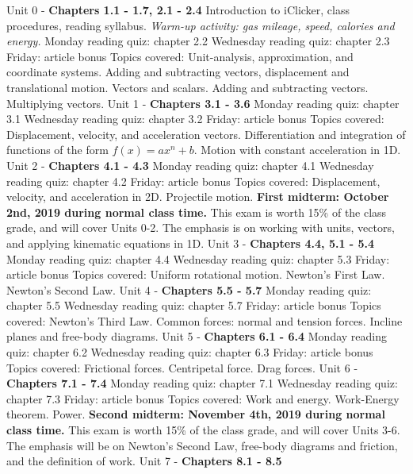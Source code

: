 \documentclass[10pt]{article}
\begin{document}
\begin{outline}[enumerate]
\1 Unit 0 - \textbf{Chapters 1.1 - 1.7, 2.1 - 2.4}
\2 Introduction to iClicker, class procedures, reading syllabus.
\2 \textit{Warm-up activity: gas mileage, speed, calories and energy.}
\2 Monday reading quiz: chapter 2.2
\2 Wednesday reading quiz: chapter 2.3
\2 Friday: article bonus
\2 Topics covered: 
\3 Unit-analysis, approximation, and coordinate systems.
\3 Adding and subtracting vectors, displacement and translational motion.
\3 Vectors and scalars.
\3 Adding and subtracting vectors.
\3 Multiplying vectors.
\1 Unit 1 - \textbf{Chapters 3.1 - 3.6}
\2 Monday reading quiz: chapter 3.1
\2 Wednesday reading quiz: chapter 3.2
\2 Friday: article bonus
\2 Topics covered:
\3 Displacement, velocity, and acceleration vectors.
\3 Differentiation and integration of functions of the form $f(x) = a x^n + b$.
\3 Motion with constant acceleration in 1D.
\1 Unit 2 - \textbf{Chapters 4.1 - 4.3}
\2 Monday reading quiz: chapter 4.1
\2 Wednesday reading quiz: chapter 4.2
\2 Friday: article bonus
\2 Topics covered:
\3 Displacement, velocity, and acceleration in 2D.
\3 Projectile motion.
\1 \textbf{First midterm: October 2nd, 2019 during normal class time.}  This exam is worth 15\% of the class grade, and will cover Units 0-2. The emphasis is on working with units, vectors, and applying kinematic equations in 1D.
\1 Unit 3 - \textbf{Chapters 4.4, 5.1 - 5.4}
\2 Monday reading quiz: chapter 4.4
\2 Wednesday reading quiz: chapter 5.3
\2 Friday: article bonus
\2 Topics covered:
\3 Uniform rotational motion.
\3 Newton's First Law.
\3 Newton's Second Law.
\1 Unit 4 - \textbf{Chapters 5.5 - 5.7}
\2 Monday reading quiz: chapter 5.5
\2 Wednesday reading quiz: chapter 5.7
\2 Friday: article bonus
\2 Topics covered:
\3 Newton's Third Law.
\3 Common forces: normal and tension forces.
\3 Incline planes and free-body diagrams.
\1 Unit 5 - \textbf{Chapters 6.1 - 6.4}
\2 Monday reading quiz: chapter 6.2
\2 Wednesday reading quiz: chapter 6.3
\2 Friday: article bonus
\2 Topics covered:
\3 Frictional forces.
\3 Centripetal force.
\3 Drag forces.
\1 Unit 6 - \textbf{Chapters 7.1 - 7.4}
\2 Monday reading quiz: chapter 7.1
\2 Wednesday reading quiz: chapter 7.3
\2 Friday: article bonus
\2 Topics covered:
\3 Work and energy.
\3 Work-Energy theorem.
\3 Power.
\1 \textbf{Second midterm: November 4th, 2019 during normal class time.} This exam is worth 15\% of the class grade, and will cover Units 3-6. The emphasis will be on Newton's Second Law, free-body diagrams and friction, and the definition of work.
\1 Unit 7 - \textbf{Chapters 8.1 - 8.5}

\end{outline}
\end{document}
